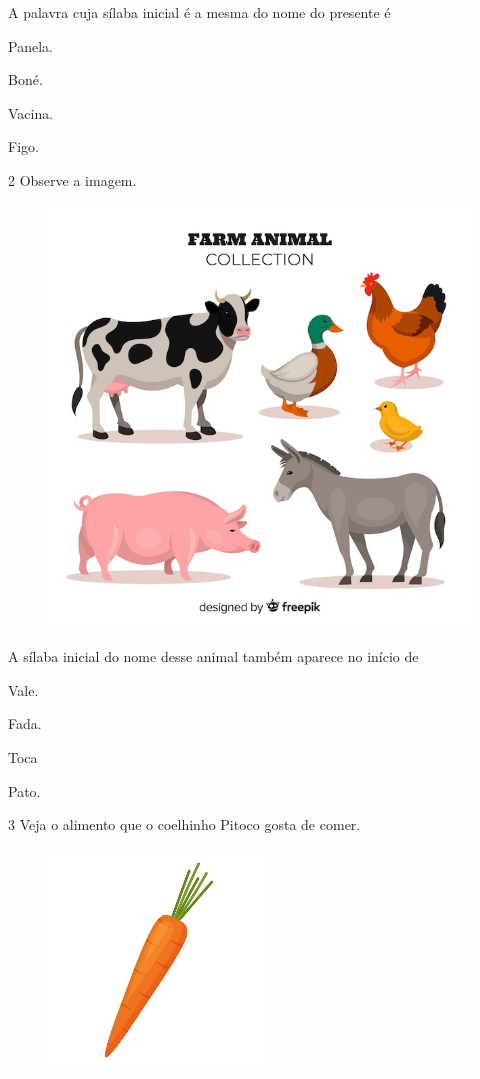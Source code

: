 A palavra cuja sílaba inicial é a mesma do nome do presente é

\begin{escolha}
\item Panela.

\item Boné.

\item Vacina.

\item Figo.
\end{escolha}

\num{2} Observe a imagem.

\begin{figure}[htpb!]
\centering
\includegraphics[width=.5\textwidth]{media/image148.jpeg}
\end{figure}


A sílaba inicial do nome desse animal também aparece no início de

\begin{escolha}
\item Vale.

\item Fada.

\item Toca

\item Pato.
\end{escolha}

\num{3} Veja o alimento que o coelhinho Pitoco gosta de comer.

\begin{figure}[htpb!]
\centering
\includegraphics[width=.5\textwidth]{media/image149.jpeg}
\end{figure}

